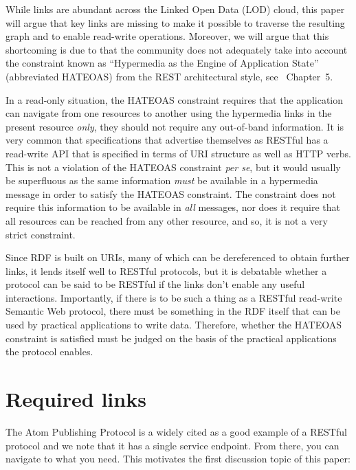 \documentclass{llncs}
\begin{document}
While links are abundant across the Linked Open Data (LOD) cloud, this
paper will argue that key links are missing to make it possible to
traverse the resulting graph and to enable read-write
operations. Moreover, we will argue that this shortcoming is due to
that the community does not adequately take into account the
constraint known as ``Hypermedia as the Engine of Application State''
(abbreviated HATEOAS) from the REST architectural style, see
\cite{Fielding_2000_Architectural-Styles}~Chapter~5.

In a read-only situation, the HATEOAS constraint requires that the
application can navigate from one resources to another using the
hypermedia links in the present resource \emph{only}, they should not
require any out-of-band information. It is very common that
specifications that advertise themselves as RESTful has a read-write
API that is specified in terms of URI structure as well as HTTP
verbs. This is not a violation of the HATEOAS constraint \textit{per
  se}, but it would usually be superfluous as the same information
\emph{must} be available in a hypermedia message in order to satisfy
the HATEOAS constraint. The constraint does not require this
information to be available in \emph{all} messages, nor does it
require that all resources can be reached from any other resource, and
so, it is not a very strict constraint.



Since RDF is built on URIs, many of which can be dereferenced to
obtain further links, it lends itself well to RESTful protocols, but
it is debatable whether a protocol can be said to be RESTful if the
links don't enable any useful interactions. Importantly, if there is
to be such a thing as a RESTful read-write Semantic Web protocol,
there must be something in the RDF itself that can be used by
practical applications to write data. Therefore, whether the HATEOAS
constraint is satisfied must be judged on the basis of the practical
applications the protocol enables.

\section{Required links}

The Atom Publishing Protocol\cite{atompub} is a widely cited as a good
example of a RESTful protocol and we note that it has a single service
endpoint. From there, you can navigate to what you need. This
motivates the first discussion topic of this paper:
\end{document}
